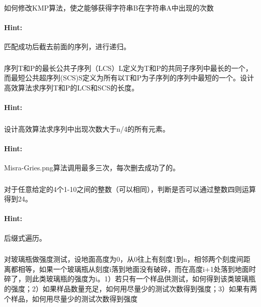 \documentclass{article}
\begin{document}
     \subsubsection{}如何修改KMP算法，使之能够获得字符串B在字符串A中出现的次数
     \paragraph{Hint:}匹配成功后截去前面的序列，进行递归。
     
      \subsubsection{}序列T和P的最长公共子序列（LCS）L定义为T和P的共同子序列中最长的一个，而最短公共超序列(SCS)S定义为所有以T和P为子序列的序列中最短的一个。设计高效算法求序列T和P的LCS和SCS的长度。
     \paragraph{Hint:}
     
     \subsubsection{}设计高效算法求序列中出现次数大于n/4的所有元素。
     \paragraph{Hint:}Misra-Gries.png算法调用最多三次，每次删去成功了的。
     
     \subsubsection{}对于任意给定的4个1-10之间的整数（可以相同），判断是否可以通过整数四则运算得到24。
     \paragraph{Hint:}后缀式遍历。
     
     \subsubsection{}对玻璃瓶做强度测试，设地面高度为0，从0往上有刻度1到n，相邻两个刻度间距离都相等，如果一个玻璃瓶从刻度i落到地面没有破碎，而在高度i+1处落到地面时碎了，则此类玻璃瓶的强度为i。1）若只有一个样品供测试，如何得到该类玻璃瓶的强度；2）如果样品数量充足，如何用尽量少的测试次数得到强度；3）如果有两个样品，如何用尽量少的测试次数得到强度
\end{document}
